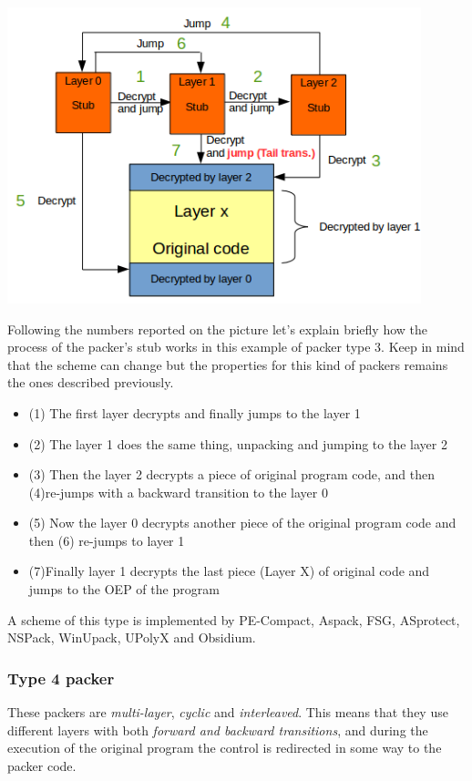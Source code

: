 \includegraphics[width=0.9\textwidth]{pictures/packer_type_3.png} 

Following the numbers reported on the picture let's explain briefly how the process of the packer's stub works in this example of packer type 3. Keep in mind that the scheme can change but the properties for this kind of packers remains the ones described previously.

\begin{itemize}
\item (1) The first layer decrypts and finally jumps to the layer 1
\item (2) The layer 1 does the same thing, unpacking and jumping to the layer 2
\item (3) Then the layer 2 decrypts a piece of original program code, and then (4)re-jumps with a backward transition to the layer 0
\item (5) Now the layer 0 decrypts another piece of the original program code and then (6) re-jumps to layer 1
\item (7)Finally layer 1 decrypts the last piece (Layer X) of original code and jumps to the \ac{OEP} of the program
\end{itemize}

A scheme of this type is implemented by PE-Compact, Aspack, FSG, ASprotect, NSPack, WinUpack, UPolyX and Obsidium.

\subsubsection{Type 4 packer}

These packers are \textit{multi-layer}, \textit{cyclic} and \textit{interleaved}. This means that they use different layers with both \textit{forward and backward transitions}, and during the execution of the original program the control is redirected in some way to the packer code.

